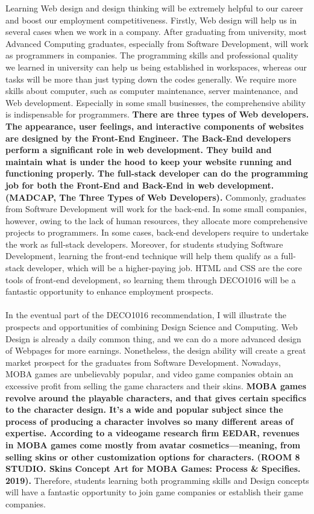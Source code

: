 \documentclass{article}
\begin{document}
	Learning Web design and design thinking will be extremely helpful to our career and boost our employment competitiveness. Firstly, Web design will help us in several cases when we work in a company. After graduating from university, most Advanced Computing graduates, especially from Software Development, will work as programmers in companies. The programming skills and professional quality we learned in university can help us being established in workspaces, whereas our tasks will be more than just typing down the codes generally. We require more skills about computer, such as computer maintenance, server maintenance, and Web development. Especially in some small businesses, the comprehensive ability is indispensable for programmers. \textbf{There are three types of Web developers. The appearance, user feelings, and interactive components of websites are designed by the Front-End Engineer. The Back-End developers perform a significant role in web development. They build and maintain what is under the hood to keep your website running and functioning properly. The full-stack developer can do the programming job for both the Front-End and Back-End in web development. (MADCAP, The Three Types of Web Developers).} Commonly, graduates from Software Development will work for the back-end. In some small companies, however, owing to the lack of human resources, they allocate more comprehensive projects to programmers. In some cases, back-end developers require to undertake the work as full-stack developers. Moreover, for students studying Software Development, learning the front-end technique will help them qualify as a full-stack developer, which will be a higher-paying job. HTML and CSS are the core tools of front-end development, so learning them through DECO1016 will be a fantastic opportunity to enhance employment prospects. \\
	\\
	In the eventual part of the DECO1016 recommendation, I will illustrate the prospects and opportunities of combining Design Science and Computing. Web Design is already a daily common thing, and we can do a more advanced design of Webpages for more earnings. Nonetheless, the design ability will create a great market prospect for the graduates from Software Development. Nowadays, MOBA games are unbelievably popular, and video game companies obtain an excessive profit from selling the game characters and their skins. \textbf{MOBA games revolve around the playable characters, and that gives certain specifics to the character design. It’s a wide and popular subject since the process of producing a character involves so many different areas of expertise. According to a videogame research firm EEDAR, revenues in MOBA games come mostly from avatar cosmetics—meaning, from selling skins or other customization options for characters.  (ROOM 8 STUDIO. Skins Concept Art for MOBA Games: Process & Specifies. 2019).} Therefore, students learning both programming skills and Design concepts will have a fantastic opportunity to join game companies or establish their game companies.\\
\end{document}
